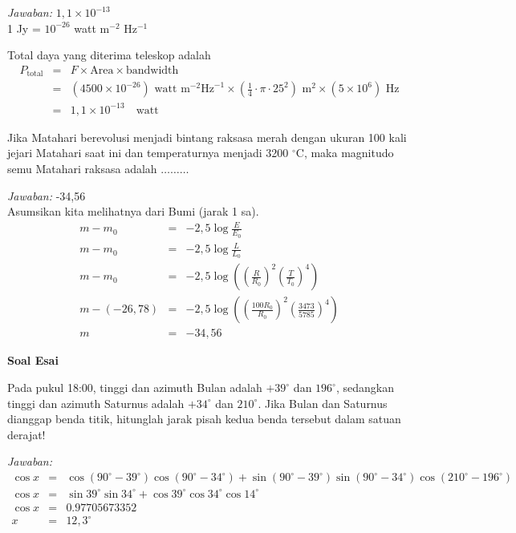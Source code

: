 \documentclass[11pt,fleqn, a4paper]{exam}
\begin{document}
\begin{questions}
\textit{Jawaban: } $1,1 \times 10^{-13}$\\

1 Jy = $10^{-26}$ watt m$^{-2}$ Hz$^{-1}$

Total daya yang diterima teleskop adalah
\begin{eqnarray*}
P_{\text{total}} &=& F \times \text{Area} \times \text{bandwidth} \\
&=& (4500 \times 10^{-26}) \text{  watt m}^{-2} \text{Hz}^{-1} \times (\frac{1}{4} \cdot \pi \cdot 25^2) \text{  m}^2 \times (5 \times 10^6) \text{  Hz}\\
&=& 1,1 \times 10^{-13} \quad \text{watt}
\end{eqnarray*}


\vspace{0.5cm}
\question Jika Matahari berevolusi menjadi bintang raksasa merah dengan ukuran 100 kali jejari Matahari saat ini dan temperaturnya menjadi 3200 $^{\circ}$C, maka magnitudo semu Matahari raksasa adalah $\ldots\ldots\ldots$

\textit{Jawaban: } -34,56\\
Asumsikan kita melihatnya dari Bumi (jarak 1 sa).
\begin{eqnarray*}
m - m_0 &=& -2,5 \log{\frac{E}{E_0}}\\
m - m_0 &=& -2,5 \log{\frac{L}{L_0}}\\
m - m_0 &=& -2,5 \log{\left( \left(\frac{R}{R_0}\right)^2 \left(\frac{T}{T_0}\right)^4 \right)}\\
m - (-26,78) &=& -2,5 \log{\left( \left(\frac{100 R_0}{R_0}\right)^2 \left(\frac{3473}{5785}\right)^4 \right)}\\
m &=& -34,56 
\end{eqnarray*}

\vspace{1cm}
\textbf{Soal Esai}

\vspace{0.5cm}
\question Pada pukul 18:00, tinggi dan azimuth Bulan adalah $+39^{\circ}$ dan $196^{\circ}$, sedangkan tinggi dan azimuth Saturnus adalah $+34^{\circ}$ dan $210^{\circ}$. Jika Bulan dan Saturnus dianggap benda titik, hitunglah jarak pisah kedua benda tersebut dalam satuan derajat!  

\textit{Jawaban: }\\
\begin{eqnarray*}
\cos{x} &=& \cos{(90^{\circ} - 39^{\circ})}\cos{(90^{\circ} - 34^{\circ})} + \sin{(90^{\circ} - 39^{\circ})}\sin{(90^{\circ} - 34^{\circ})}\cos{(210^{\circ} - 196^{\circ})}\\
\cos{x} &=& \sin{39^{\circ}} \sin{34^{\circ}} + \cos{39^{\circ}} \cos{34^{\circ}} \cos{14^{\circ}}\\
\cos{x} &=& 0.97705673352\\
x &=& 12,3^{\circ}
\end{eqnarray*}



\end{questions}
\end{document}
